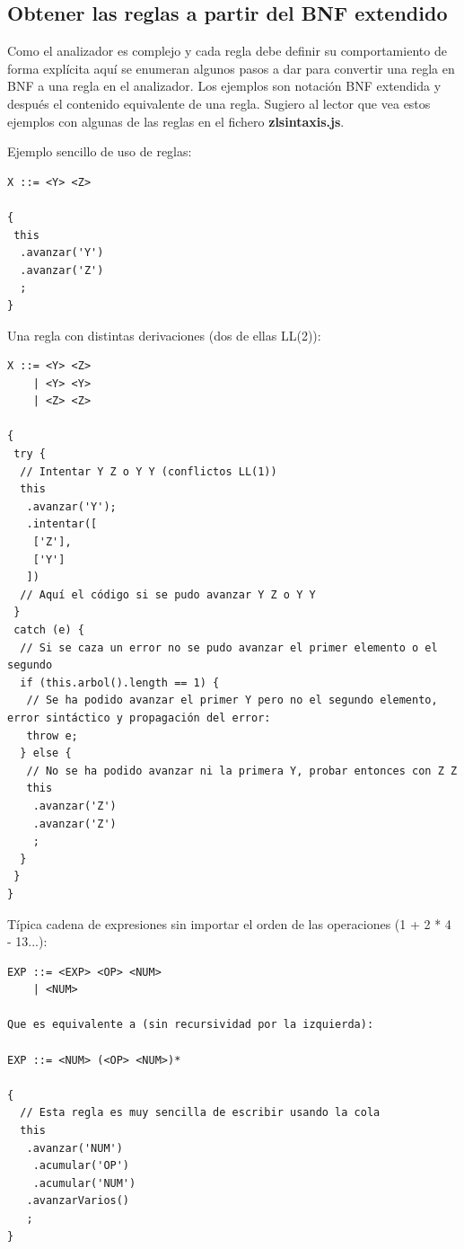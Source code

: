 \documentclass{report}
\begin{document}
	\subsection{Obtener las reglas a partir del BNF extendido}
	
	Como el analizador es complejo y cada regla debe definir su comportamiento de forma explícita aquí se enumeran algunos pasos a dar para convertir una regla en BNF a una regla en el analizador. Los ejemplos son notación BNF extendida y después el contenido equivalente de una regla. Sugiero al lector que vea estos ejemplos con algunas de las reglas en el fichero \textbf{zlsintaxis.js}.
	
	\vspace{10px}
	
	Ejemplo sencillo de uso de reglas:
	
	\begin{BVerbatim}
X ::= <Y> <Z>

{
 this
  .avanzar('Y')
  .avanzar('Z')
  ;
}
	\end{BVerbatim}

	\vspace{10px}
	Una regla con distintas derivaciones (dos de ellas LL(2)):
	
	\begin{BVerbatim}
X ::= <Y> <Z>
    | <Y> <Y>
    | <Z> <Z>
    
{
 try {
  // Intentar Y Z o Y Y (conflictos LL(1))
  this
   .avanzar('Y');
   .intentar([
    ['Z'],
    ['Y']
   ])
  // Aquí el código si se pudo avanzar Y Z o Y Y
 }
 catch (e) {
  // Si se caza un error no se pudo avanzar el primer elemento o el segundo
  if (this.arbol().length == 1) {
   // Se ha podido avanzar el primer Y pero no el segundo elemento, error sintáctico y propagación del error:
   throw e;
  } else {
   // No se ha podido avanzar ni la primera Y, probar entonces con Z Z
   this
    .avanzar('Z')
    .avanzar('Z')
	;
  }
 }
}
	\end{BVerbatim}
	
	\vspace{10px}
	Típica cadena de expresiones sin importar el orden de las operaciones (1 + 2 * 4 - 13...):
	
	\begin{BVerbatim}
EXP ::= <EXP> <OP> <NUM>
    | <NUM>
    
Que es equivalente a (sin recursividad por la izquierda):

EXP ::= <NUM> (<OP> <NUM>)*    
 
{
  // Esta regla es muy sencilla de escribir usando la cola
  this
   .avanzar('NUM')
    .acumular('OP')
    .acumular('NUM')
   .avanzarVarios()
   ;
} 
	\end{BVerbatim}
	
\end{document}
